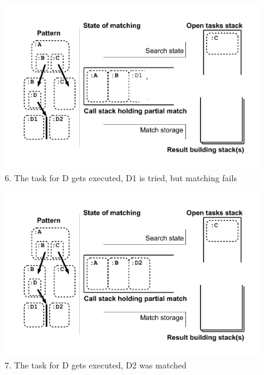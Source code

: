 \begin{figure}[htbp]
  \centering
  \includegraphics[width=\textwidth]{fig/Passungszustand6}
  \caption{6. The task for D gets executed, D1 is tried, but matching fails}
  \label{figmatchingstate6}
\end{figure}

\begin{figure}[htbp]
  \centering
  \includegraphics[width=\textwidth]{fig/Passungszustand7}
  \caption{7. The task for D gets executed, D2 was matched}
  \label{figmatchingstate7}
\end{figure}

